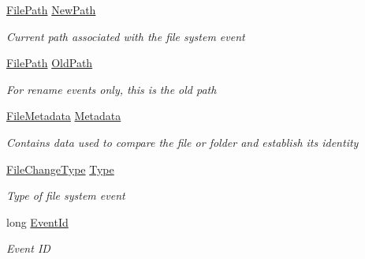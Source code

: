 \begin{DoxyCompactItemize}
\item 
\hyperlink{class_cloud_api_public_1_1_model_1_1_file_path}{File\-Path} \hyperlink{class_cloud_api_public_1_1_model_1_1_file_change_ad7383c43cc51606f17c63fad6c032c7c}{New\-Path}
\begin{DoxyCompactList}\small\item\em Current path associated with the file system event \end{DoxyCompactList}\item 
\hyperlink{class_cloud_api_public_1_1_model_1_1_file_path}{File\-Path} \hyperlink{class_cloud_api_public_1_1_model_1_1_file_change_a08ced19e1fccebb04bf6da37f21a4216}{Old\-Path}
\begin{DoxyCompactList}\small\item\em For rename events only, this is the old path \end{DoxyCompactList}\item 
\hyperlink{class_cloud_api_public_1_1_model_1_1_file_metadata}{File\-Metadata} \hyperlink{class_cloud_api_public_1_1_model_1_1_file_change_ae4e797c6b4b11f9686e4cb1318dab9a5}{Metadata}
\begin{DoxyCompactList}\small\item\em Contains data used to compare the file or folder and establish its identity \end{DoxyCompactList}\item 
\hyperlink{namespace_cloud_api_public_1_1_static_a08ff1fddb1dc38f7b861b0fd106834be}{File\-Change\-Type} \hyperlink{class_cloud_api_public_1_1_model_1_1_file_change_a6a1aeec98ba00f051497c5126adf69a4}{Type}
\begin{DoxyCompactList}\small\item\em Type of file system event \end{DoxyCompactList}\item 
long \hyperlink{class_cloud_api_public_1_1_model_1_1_file_change_aef22ff9ac6993f82e3612d05f093e836}{Event\-Id}
\begin{DoxyCompactList}\small\item\em Event I\-D \end{DoxyCompactList}\item 

\end{DoxyCompactItemize}
